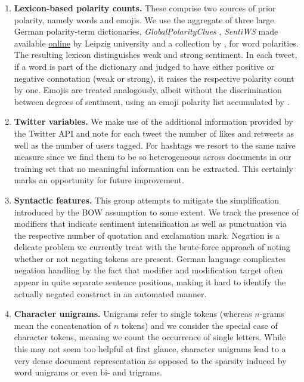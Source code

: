 \begin{enumerate}

  \item \textbf{Lexicon-based polarity counts.} These comprise two sources of 
  prior polarity, namely words and emojis. 
  We use the aggregate of three large German polarity-term dictionaries, 
  \textit{GlobalPolarityClues} \citep{waltinger2010}, \textit{SentiWS} 
  made available \href{https://wortschatz.uni-leipzig.de/en/download}{online}
  by Leipzig university and a collection by \citet{rauh2018}, for word 
  polarities.
  The resulting lexicon distinguishes weak and strong sentiment.
  In each tweet, if a word is part of the dictionary and judged to have 
  either positive or negative connotation (weak or strong), it raises the 
  respective polarity count by one.
  Emojis are treated analogously, albeit without the discrimination between 
  degrees of sentiment, using an emoji polarity list accumulated by 
  \citet{kraljetal2015}.
  
  \item \textbf{Twitter variables.} We make use of the additional information 
  provided by the Twitter API and note for each tweet the number of likes and 
  retweets as well as the number of users tagged.
  For hashtags we resort to the same naive measure since we find them to be so 
  heterogeneous across documents in our training set that no meaningful 
  information can be extracted. 
  This certainly marks an opportunity for future improvement.
  
  \item \textbf{Syntactic features.} This group attempts to mitigate the 
  simplification introduced by the BOW assumption to some extent.
  We track the presence of modifiers that indicate sentiment intensification 
  as well as punctuation via the respective number of quotation and exclamation 
  mark.
  Negation is a delicate problem we currently treat with the brute-force 
  approach of noting whether or not negating tokens are present.
  German language complicates negation handling by the fact that modifier and 
  modification target often appear in quite separate sentence positions, making 
  it hard to identify the actually negated construct in an automated manner.
  
  \item \textbf{Character unigrams.} Unigrams refer to single tokens (whereas 
  $n$-grams mean the concatenation of $n$ tokens) and we consider the special 
  case of character tokens, meaning we count the occurrence of single letters.
  While this may not seem too helpful at first glance, character unigrams 
  lead to a very dense document representation as opposed to the sparsity 
  induced by word unigrams or even bi- and trigrams.
  

\end{enumerate}
